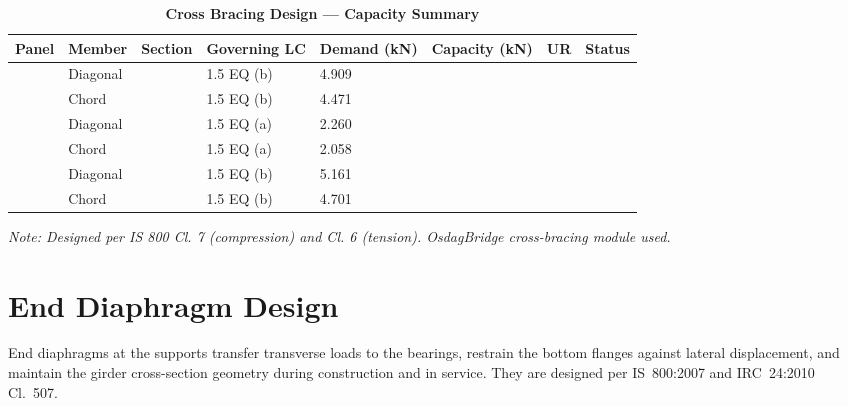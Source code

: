 \documentclass[12pt,a4paper]{report}
\numberwithin{table}{chapter}
\numberwithin{figure}{chapter}
\begin{document}
\vspace{1em}
\begin{longtable}{|C{2.0cm}|L{1.8cm}|C{2.2cm}|C{3.0cm}|C{1.8cm}|C{1.8cm}|C{1.2cm}|C{1.8cm}|}
\caption{\textbf{Cross Bracing Design --- Capacity Summary}}
\hline
\textbf{Panel} & \textbf{Member} & \textbf{Section} & \textbf{Governing LC} & \textbf{Demand (kN)} & \textbf{Capacity (kN)} & \textbf{UR} & \textbf{Status} \\[6pt]
\hline
{} & Diagonal &  & 1.5 EQ (b) & 4.909 &  &  &  \\[6pt]
 & Chord &  & 1.5 EQ (b) & 4.471 &  &  &  \\[6pt]
\hline
{} & Diagonal &  & 1.5 EQ (a) & 2.260 &  &  &  \\[6pt]
 & Chord &  & 1.5 EQ (a) & 2.058 &  &  &  \\[6pt]
\hline
{} & Diagonal &  & 1.5 EQ (b) & 5.161 &  &  &  \\[6pt]
 & Chord &  & 1.5 EQ (b) & 4.701 &  &  &  \\[6pt]
\hline
\end{longtable}
\noindent\textit{Note: Designed per IS 800 Cl. 7 (compression) and Cl. 6 (tension). OsdagBridge cross-bracing module used.}

\section{End Diaphragm Design}
\label{sec:end-diaphragm}

End diaphragms at the supports transfer transverse loads to the bearings, restrain the bottom flanges against lateral displacement, and maintain the girder cross-section geometry during construction and in service. They are designed per IS~800:2007 and IRC~24:2010 Cl.~507.

\vspace{1em}

\vspace{0.4em}
\noindent
\setlength{\tabcolsep}{4pt}
\setlength{\LTleft}{0pt}
\setlength{\LTright}{\fill}
\end{document}
